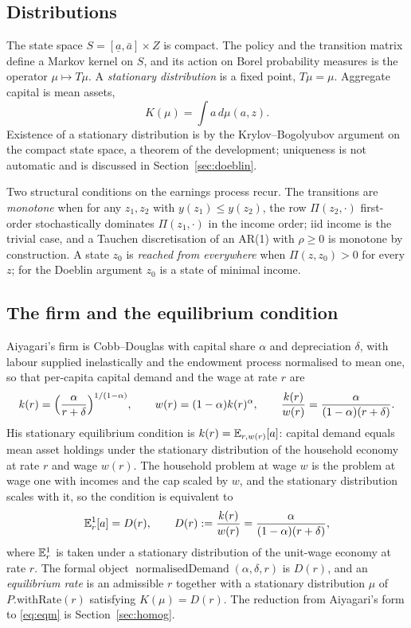 \subsection{Distributions}

The state space $S=[\underline a,\bar a]\times Z$ is compact. The policy and the transition matrix
define a Markov kernel on $S$, and its action on Borel probability measures is the operator
$\mu\mapsto T\mu$. A \emph{stationary distribution} is a fixed point, $T\mu=\mu$. Aggregate capital
is mean assets,
\[
  K(\mu)=\int a\,d\mu(a,z).
\]
Existence of a stationary distribution is by the Krylov--Bogolyubov argument on the compact state
space, a theorem of the development; uniqueness is not automatic and is discussed in
Section~\ref{sec:doeblin}.

Two structural conditions on the earnings process recur. The transitions are \emph{monotone} when
for any $z_1,z_2$ with $y(z_1)\le y(z_2)$, the row $\Pi(z_2,\cdot)$ first-order stochastically
dominates $\Pi(z_1,\cdot)$ in the income order; iid income is the trivial case, and a Tauchen
discretisation of an AR(1) with $\rho\ge0$ is monotone by construction. A state $z_0$ is
\emph{reached from everywhere} when $\Pi(z,z_0)>0$ for every $z$; for the Doeblin argument $z_0$
is a state of minimal income.

\subsection{The firm and the equilibrium condition}

Aiyagari's firm is Cobb--Douglas with capital share $\alpha$ and depreciation $\delta$, with labour
supplied inelastically and the endowment process normalised to mean one, so that per-capita capital
demand and the wage at rate $r$ are
\[
  k(r)=\Bigl(\frac{\alpha}{r+\delta}\Bigr)^{1/(1-\alpha)},\qquad
  w(r)=(1-\alpha)k(r)^{\alpha},\qquad
  \frac{k(r)}{w(r)}=\frac{\alpha}{(1-\alpha)(r+\delta)}.
\]
His stationary equilibrium condition is $k(r)=\mathbb{E}_{r,w(r)}[a]$: capital demand equals mean asset
holdings under the stationary distribution of the household economy at rate $r$ and wage $w(r)$.
The household problem at wage $w$ is the problem at wage one with incomes and the cap scaled by
$w$, and the stationary distribution scales with it, so the condition is equivalent to
\begin{equation}\label{eq:eqm}
  \mathbb{E}^{1}_{r}[a]=D(r),\qquad D(r):=\frac{k(r)}{w(r)}=\frac{\alpha}{(1-\alpha)(r+\delta)},
\end{equation}
where $\mathbb{E}^1_r$ is taken under a stationary distribution of the unit-wage economy at rate $r$. The
formal object $\operatorname{normalisedDemand}(\alpha,\delta,r)$ is $D(r)$, and an
\emph{equilibrium rate} is an admissible $r$ together with a stationary distribution $\mu$ of
$P.\text{withRate}(r)$ satisfying $K(\mu)=D(r)$. The reduction from Aiyagari's form to
\eqref{eq:eqm} is Section~\ref{sec:homog}.

